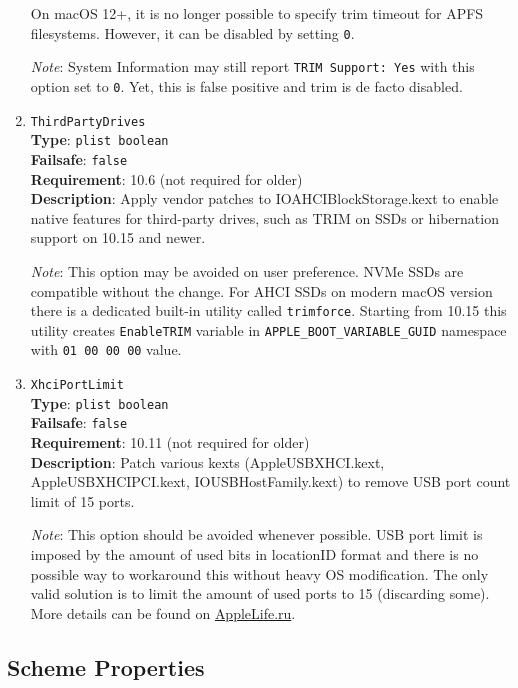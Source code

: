 \documentclass[]{article}
\begin{document}
\begin{enumerate}
  On macOS 12+, it is no longer possible to specify trim timeout for APFS filesystems.
  However, it can be disabled by setting \texttt{0}.

  \emph{Note}: System Information may still report \texttt{TRIM Support: Yes} with this
  option set to \texttt{0}. Yet, this is false positive and trim is de facto disabled.

\item
  \texttt{ThirdPartyDrives}\\
  \textbf{Type}: \texttt{plist\ boolean}\\
  \textbf{Failsafe}: \texttt{false}\\
  \textbf{Requirement}: 10.6 (not required for older)\\
  \textbf{Description}: Apply vendor patches to IOAHCIBlockStorage.kext to enable
  native features for third-party drives, such as TRIM on SSDs or hibernation
  support on 10.15 and newer.

  \emph{Note}: This option may be avoided on user preference. NVMe SSDs are
  compatible without the change. For AHCI SSDs on modern macOS version there
  is a dedicated built-in utility called \texttt{trimforce}. Starting from 10.15
  this utility creates \texttt{EnableTRIM} variable in \texttt{APPLE\_BOOT\_VARIABLE\_GUID}
  namespace with \texttt{01 00 00 00} value.

\item
  \texttt{XhciPortLimit}\\
  \textbf{Type}: \texttt{plist\ boolean}\\
  \textbf{Failsafe}: \texttt{false}\\
  \textbf{Requirement}: 10.11 (not required for older)\\
  \textbf{Description}: Patch various kexts (AppleUSBXHCI.kext, AppleUSBXHCIPCI.kext,
  IOUSBHostFamily.kext) to remove USB port count limit of 15 ports.

  \emph{Note}: This option should be avoided whenever possible. USB port limit
  is imposed by the amount of used bits in locationID format and there is no
  possible way to workaround this without heavy OS modification. The only
  valid solution is to limit the amount of used ports to 15 (discarding some).
  More details can be found on \href{https://applelife.ru/posts/550233}{AppleLife.ru}.

\end{enumerate}

\subsection{Scheme Properties}\label{kernelpropsscheme}
\end{document}
